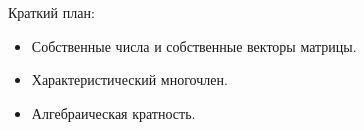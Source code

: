 
\begin{frame} %


\end{frame}



\begin{frame}{Краткий план:}
  \begin{itemize}[<+->]
    \item Собственные числа и собственные векторы матрицы.
    \item Характеристический многочлен.
    \item Алгебраическая кратность.
  \end{itemize}

\end{frame}


